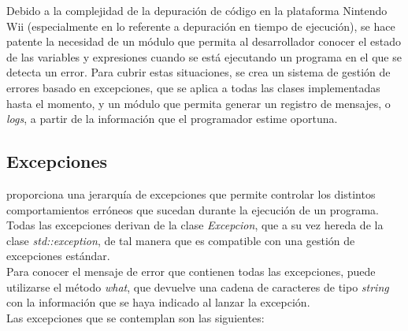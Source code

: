 



Debido a la complejidad de la depuración de código en la plataforma Nintendo Wii (especialmente en lo referente a depuración en tiempo de ejecución), se hace patente la necesidad de un módulo que permita al desarrollador conocer el estado de las variables y expresiones cuando se está ejecutando un programa en el que se detecta un error. Para cubrir estas situaciones, se crea un sistema de gestión de errores basado en excepciones, que se aplica a todas las clases implementadas hasta el momento, y un módulo que permita generar un registro de mensajes, o \emph{logs}, a partir de la información que el programador estime oportuna.

\subsection{Excepciones}

 proporciona una jerarquía de excepciones que permite controlar los distintos comportamientos erróneos que sucedan durante la ejecución de un programa. Todas las excepciones derivan de la clase \emph{Excepcion}, que a su vez hereda de la clase \emph{std::exception}, de tal manera que es compatible con una gestión de excepciones estándar.\\

Para conocer el mensaje de error que contienen todas las excepciones, puede utilizarse el método \emph{what}, que devuelve una cadena de caracteres de tipo \emph{string} con la información que se haya indicado al lanzar la excepción.\\

Las excepciones que se contemplan son las siguientes:


